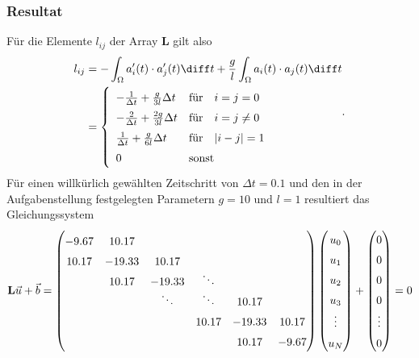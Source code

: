 \subsubsection{Resultat}
Für die Elemente $l_{ij}$ der Array $\mathbf{L}$ gilt also
\begin{equation}
    \begin{aligned}
        l_{ij} 
        &= - \int_\Omega a_i'(t) \cdot a_j'(t) \diff t + \frac{g}{l} \int_\Omega a_i(t) \cdot a_j(t) \diff t \\
        &=  \left\{ 
                \begin{array}{ll}
                    - \frac{1}{\Delta t} + \frac{g}{3l} \Delta t & \text{für} \quad i = j = 0 \\
                    - \frac{2}{\Delta t} + \frac{2g}{3l} \Delta t & \text{für} \quad i = j \neq 0 \\
                    \frac{1}{\Delta t} + \frac{g}{6l} \Delta t & \text{für} \quad |i - j| = 1 \\
                    0 & \text{sonst}
                \end{array} 
            \right.
    \end{aligned}.
\end{equation}
Für einen willkürlich gewählten Zeitschritt von $\Delta t = 0.1$ und den in der Aufgabenstellung festgelegten Parametern $g = 10$ und $l = 1$ resultiert das Gleichungssystem
\begin{equation}
    \def\arraystretch{1.5}
    \mathbf{L}\vec{u} + \vec{b} 
    = \begin{pmatrix}
         -9.67  & 10.17  &                &                &        &        \\
         10.17  &-19.33  & 10.17          &                &        &        \\
                & 10.17  &-19.33          & \smash{\ddots} &        &        \\
                &        & \smash{\ddots} & \smash{\ddots} & 10.17  &        \\
                &        &                & 10.17          &-19.33  & 10.17  \\
                &        &                &                & 10.17  & -9.67
    \end{pmatrix}
    \begin{pmatrix}
        u_0 \\ u_1 \\ u_2 \\ u_3 \\ \vdots \\ u_N
    \end{pmatrix}
    +
    \begin{pmatrix}
        0 \\ 0 \\ 0 \\ 0 \\ \vdots \\ 0
    \end{pmatrix}
    = 0
    \label{fem:rechenbsp:gleichungssystem}
\end{equation}


